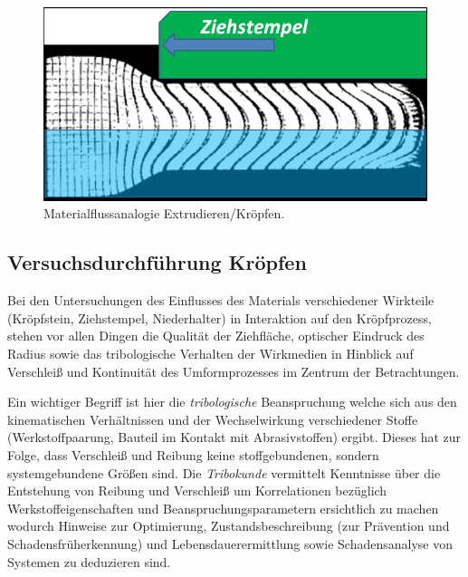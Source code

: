 \documentclass[12pt,a4paper,parskip,twoside,BCOR5mm,headsepline]{scrartcl}
\begin{document}
\begin{description*}
\begin{figure}[hbtp]
\centering
\includegraphics[width=.8\textwidth]{materialflussvergleich}
\caption{Materialflussanalogie Extrudieren/Kröpfen. \autocite[13.9]{kl}}
\label{fig:git}
\end{figure}



\subsection{Versuchsdurchführung Kröpfen}
Bei den Untersuchungen des Einflusses des Materials verschiedener Wirkteile (Kröpfstein, Ziehstempel, Niederhalter) in Interaktion  auf den Kröpfprozess, stehen vor allen Dingen die Qualität der Ziehfläche, optischer Eindruck des Radius  sowie das tribologische Verhalten der Wirkmedien in Hinblick auf Verschleiß und Kontinuität des Umformprozesses im Zentrum der Betrachtungen.

Ein wichtiger Begriff ist hier die \emph{tribologische} Beanspruchung welche sich aus den kinematischen Verhältnissen und der Wechselwirkung verschiedener Stoffe (Werkstoffpaarung, Bauteil im Kontakt mit Abrasivstoffen) ergibt. Dieses hat zur Folge, dass Verschleiß und Reibung keine stoffgebundenen, sondern systemgebundene Größen sind. Die \emph{Tribokunde} vermittelt Kenntnisse über die Entstehung von Reibung und Verschleiß um Korrelationen bezüglich Werkstoffeigenschaften und Beanspruchungsparametern ersichtlich zu machen wodurch Hinweise zur Optimierung, Zustandsbeschreibung (zur Prävention und Schadensfrüherkennung) und Lebensdauerermittlung sowie Schadensanalyse von Systemen zu deduzieren sind. \autocite[388-390]{wki}


\end{description*}
\end{document}
